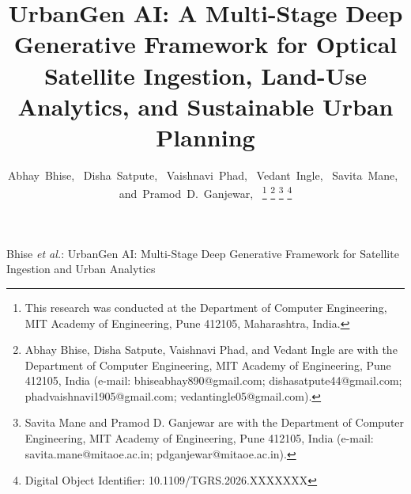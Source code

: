 \documentclass[journal]{IEEEtran}
\begin{document}
\title{UrbanGen AI: A Multi-Stage Deep Generative Framework for Optical Satellite Ingestion, Land-Use Analytics, and Sustainable Urban Planning}

\author{Abhay~Bhise,~
        Disha~Satpute,~
        Vaishnavi~Phad,~
        Vedant~Ingle,~
        Savita~Mane,~
        and~Pramod~D.~Ganjewar,~%
\thanks{This research was conducted at the Department of Computer Engineering, MIT Academy of Engineering, Pune 412105, Maharashtra, India.}%
\thanks{Abhay Bhise, Disha Satpute, Vaishnavi Phad, and Vedant Ingle are with the Department of Computer Engineering, MIT Academy of Engineering, Pune 412105, India (e-mail: bhiseabhay890@gmail.com; dishasatpute44@gmail.com; phadvaishnavi1905@gmail.com; vedantingle05@gmail.com).}%
\thanks{Savita Mane and Pramod D. Ganjewar are with the Department of Computer Engineering, MIT Academy of Engineering, Pune 412105, India (e-mail: savita.mane@mitaoe.ac.in; pdganjewar@mitaoe.ac.in).}%
\thanks{Digital Object Identifier: 10.1109/TGRS.2026.XXXXXXX}}

%
{Bhise \MakeLowercase{\textit{et al.}}: UrbanGen AI: Multi-Stage Deep Generative Framework for Satellite Ingestion and Urban Analytics}

\maketitle
\end{document}
